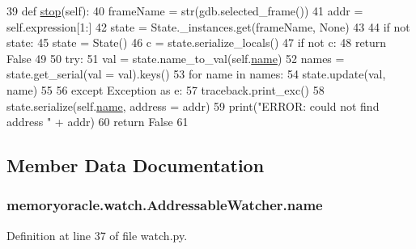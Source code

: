\begin{DoxyCode}
39     \textcolor{keyword}{def }\hyperlink{classmemoryoracle_1_1watch_1_1AddressableWatcher_a9db9d7d3b1a32e74ebecb3cdb2537015}{stop}(self):
40         frameName = str(gdb.selected\_frame())
41         addr = self.expression[1:]
42         state = State.\_instances.get(frameName, \textcolor{keywordtype}{None})
43 
44         \textcolor{keywordflow}{if} \textcolor{keywordflow}{not} state:
45             state = State()
46             c = state.serialize\_locals()
47             \textcolor{keywordflow}{if} \textcolor{keywordflow}{not} c:
48                 \textcolor{keywordflow}{return} \textcolor{keyword}{False}
49 
50         \textcolor{keywordflow}{try}:
51             val = state.name\_to\_val(self.\hyperlink{classmemoryoracle_1_1watch_1_1AddressableWatcher_a7b7679f54a21d0a3efc5e785df46186e}{name})
52             names = state.get\_serial(val = val).keys()
53             \textcolor{keywordflow}{for} name \textcolor{keywordflow}{in} names:
54                 state.update(val, name)
55 
56         \textcolor{keywordflow}{except} Exception \textcolor{keyword}{as} e:
57             traceback.print\_exc()
58             state.serialize(self.\hyperlink{classmemoryoracle_1_1watch_1_1AddressableWatcher_a7b7679f54a21d0a3efc5e785df46186e}{name}, address = addr)
59             print(\textcolor{stringliteral}{"ERROR: could not find address "} + addr)
60         \textcolor{keywordflow}{return} \textcolor{keyword}{False}
61 
\end{DoxyCode}


\subsection{Member Data Documentation}
\hypertarget{classmemoryoracle_1_1watch_1_1AddressableWatcher_a7b7679f54a21d0a3efc5e785df46186e}{}
\subsubsection[{name}]{\setlength{\rightskip}{0pt plus 5cm}memoryoracle.\+watch.\+Addressable\+Watcher.\+name}\label{classmemoryoracle_1_1watch_1_1AddressableWatcher_a7b7679f54a21d0a3efc5e785df46186e}


Definition at line 37 of file watch.\+py.



